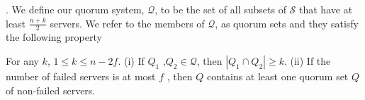 . We define our quorum system, $\mathcal{Q}$, to be
the set of all subsets of $\mathcal{S}$  that have at least $\frac{n+k}{2}$ servers. 
 We refer to the members of $\mathcal{Q}$, as quorum
sets and they satisfy the following
property

\begin{lemma}
For any $k$,  $1 \leq k \leq n -2f$. (i) If $Q_1$ ,$Q_2 \in \mathcal{Q}$,
then $|Q_1 \cap Q_2 | \geq k$. (ii) If the number of failed servers is
at most $f$ , then $Q$ contains at least one quorum set $Q$ of
non-failed servers.
\end{lemma}


%

